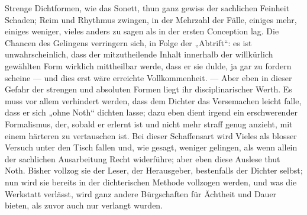 Strenge Dichtformen, wie das Sonett, thun ganz gewiss der sachlichen Feinheit Schaden; Reim und Rhythmus zwingen, in der Mehrzahl der Fälle, einiges mehr, einiges weniger, vieles anders zu sagen als in der ersten Conception lag. Die Chancen des Gelingens verringern sich, in Folge der „Abtrift“: es ist unwahrscheinlich, dass der mitzutheilende Inhalt innerhalb der willkürlich gewählten Form wirklich mittheilbar werde, dass er sie dulde, ja gar zu fordern scheine — und dies erst wäre erreichte Vollkommenheit. — Aber eben in dieser Gefahr der strengen und absoluten Formen liegt ihr disciplinarischer Werth. Es muss vor allem verhindert werden, dass dem Dichter das Versemachen leicht falle, dass er sich „ohne Noth“ dichten lasse; dazu eben dient irgend ein erschwerender Formalismus, der, sobald er erlernt ist und nicht mehr straff genug anzieht, mit einem härteren zu vertauschen ist. Bei dieser Schaffensart wird Vieles als blosser Versuch unter den Tisch fallen und, wie gesagt, weniger gelingen, als wenn allein der sachlichen Ausarbeitung Recht widerführe; aber eben diese Auslese thut Noth. Bisher vollzog sie der Leser, der Herausgeber, bestenfalls der Dichter selbst; nun wird sie bereits in der dichterischen Methode vollzogen werden, und was die Werkstatt verlässt, wird ganz andere Bürgschaften für Ächtheit und Dauer bieten, als zuvor auch nur verlangt wurden.
\par

